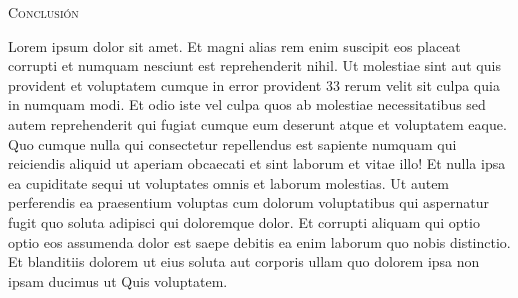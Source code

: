\raggedright{\scshape\Huge Conclusión \par}
\justify
 Lorem ipsum dolor sit amet. Et magni alias rem enim suscipit eos placeat corrupti et numquam nesciunt est reprehenderit nihil. Ut molestiae sint aut quis provident et voluptatem cumque in error provident 33 rerum velit sit culpa quia in numquam modi. Et odio iste vel culpa quos ab molestiae necessitatibus sed autem reprehenderit qui fugiat cumque eum deserunt atque et voluptatem eaque.
\newline
Quo cumque nulla qui consectetur repellendus est sapiente numquam qui reiciendis aliquid ut aperiam obcaecati et sint laborum et vitae illo! Et nulla ipsa ea cupiditate sequi ut voluptates omnis et laborum molestias.
\newline 
Ut autem perferendis ea praesentium voluptas cum dolorum voluptatibus qui aspernatur fugit quo soluta adipisci qui doloremque dolor. Et corrupti aliquam qui optio optio eos assumenda dolor est saepe debitis ea enim laborum quo nobis distinctio. Et blanditiis dolorem ut eius soluta aut corporis ullam quo dolorem ipsa non ipsam ducimus ut Quis voluptatem.